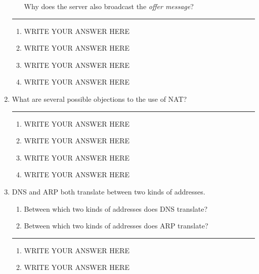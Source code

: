 \documentclass[twoside]{article}
\newenvironment{answer}
  {\vspace*{0.2cm} \rule{12cm}{0.04cm} \vspace*{0.2cm}}
  {\vspace*{0.2cm}}
\begin{document}
\begin{enumerate}
\begin{enumerate}
      Why does the server also broadcast the \emph{offer message}?

    \end{enumerate}

  \begin{answer}

  \begin{enumerate}
    \item WRITE YOUR ANSWER HERE
    \item WRITE YOUR ANSWER HERE
    \item WRITE YOUR ANSWER HERE
    \item WRITE YOUR ANSWER HERE
    \end{enumerate}

    \end{answer}

  \item What are several possible objections to the use of NAT?

  \begin{answer}

  \begin{enumerate}
    \item WRITE YOUR ANSWER HERE
    \item WRITE YOUR ANSWER HERE
    \item WRITE YOUR ANSWER HERE
    \item WRITE YOUR ANSWER HERE
    \end{enumerate}

    \end{answer}

  \item DNS and ARP both translate between two kinds of addresses.
  \begin{enumerate}
    \item Between which two kinds of addresses does DNS translate?
    \item Between which two kinds of addresses does ARP translate?
    \end{enumerate}

  \begin{answer}

  \begin{enumerate}
    \item WRITE YOUR ANSWER HERE
    \item WRITE YOUR ANSWER HERE
    \end{enumerate}

    \end{answer}


\end{enumerate}
\end{document}
